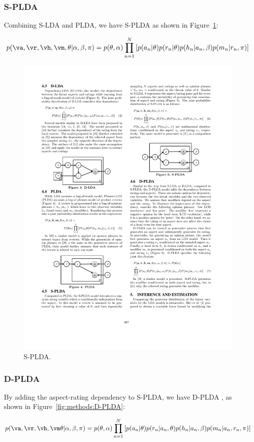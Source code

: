 \subsubsection{S-PLDA}

Combining S-LDA and PLDA, we have S-PLDA \cite{moghaddam2012design} as shown in Figure~\ref{fig:methods:S-PLDA}:

$$p(\va, \vr, \vh, \vm, \theta | \alpha, \beta, \pi) = p(\theta, \alpha) \prod_{n=1}^N \left[ 
p(a_n| \theta) p(r_n | \theta) p(h_n | a_n, \beta) p(m_n | r_n, \pi)\right]$$

\begin{figure}
\centering
\includegraphics[width=0.5\columnwidth]{figures/methods/S-PLDA}
\caption{S-PLDA. \cite{moghaddam2012design}}
\label{fig:methods:S-PLDA}
\end{figure}

\subsubsection{D-PLDA}

By adding the aspect-rating dependency to S-PLDA, we have D-PLDA \cite{moghaddam2011ILDA,moghaddam2012design}, as shown in Figure~\ref{fig:methods:D-PLDA}:

$$p(\va, \vr, \vh, \vm \theta | \alpha, \beta, \pi) = p(\theta, \alpha) \prod_{n=1}^N \left[ 
p(a_n| \theta) p(r_n | a_n, \theta) p(h_n | a_n, \beta) p(m_n | a_n, r_n, \pi)\right]$$

